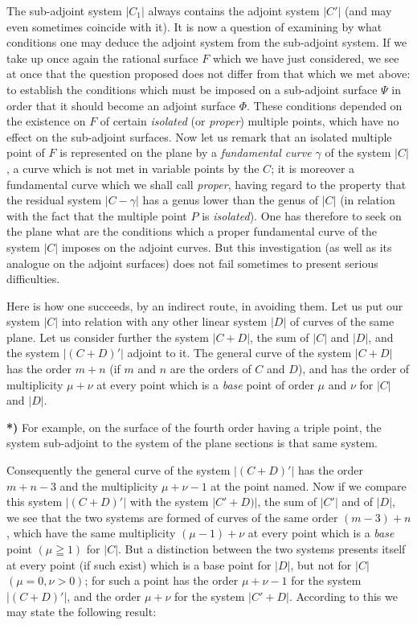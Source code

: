 \documentclass{article}
\begin{document}
The sub-adjoint system $|C_{1}|$ always contains the adjoint system $|C'|$ (and may even sometimes coincide with it). It is now a question of examining by what conditions one may deduce the adjoint system from the sub-adjoint system. If we take up once again the rational surface $F$ which we have just considered, we see at once that the question proposed does not differ from that which we met above: to establish the conditions which must be imposed on a sub-adjoint surface $\Psi$ in order that it should become an adjoint surface $\Phi$. These conditions depended on the existence on $F$ of certain \emph{isolated} (or \emph{proper}) multiple points, which have no effect on the sub-adjoint surfaces. Now let us remark that an isolated multiple point of $F$ is represented on the plane by a \emph{fundamental curve $\gamma$} of the system $|C|$, a curve which is not met in variable points by the $C$; it is moreover a fundamental curve which we shall call \emph{proper}, having regard to the property that the residual system $|C-\gamma|$ has a genus lower than the genus of $|C|$ (in relation with the fact that the multiple point $P$ is \emph{isolated}). One has therefore to seek on the plane what are the conditions which a proper fundamental curve of the system $|C|$ imposes on the adjoint curves. But this investigation (as well as its analogue on the adjoint surfaces) does not fail sometimes to present serious difficulties.

Here is how one succeeds, by an indirect route, in avoiding them. Let us put our system $|C|$ into relation with any other linear system $|D|$ of curves of the same plane. Let us consider further the system $|C+D|$, the sum of $|C|$ and $|D|$, and the system $|(C+D)'|$ adjoint to it. The general curve of the system $|C+D|$ has the order $m+n$ (if $m$ and $n$ are the orders of $C$ and $D$), and has the order of multiplicity $\mu+\nu$ at every point which is a \emph{base} point of order $\mu$ and $\nu$ for $|C|$ and $|D|$.

\textbf{*)} For example, on the surface of the fourth order having a triple point, the system sub-adjoint to the system of the plane sections is that same system.

Consequently the general curve of the system $|(C+D)'|$ has the order $m+n-3$ and the multiplicity $\mu + \nu - 1$ at the point named. Now if we compare this system $|(C + D)'|$ with the system $|C' + D)|$, the sum of $|C'|$ and of $|D|$, we see that the two systems are formed of curves of the same order $(m - 3) + n$, which have the same multiplicity $(\mu - 1) + \nu$ at every point which is a \emph{base} point $(\mu \geqq 1)$ for $|C|$. But a distinction between the two systems presents itself at every point (if such exist) which is a base point for $|D|$, but not for $|C|$ $(\mu = 0, \nu > 0)$; for such a point has the order $\mu + \nu - 1$ for the system $|(C + D)'|$, and the order $\mu + \nu$ for the system $|C' + D|$. According to this we may state the following result:
\end{document}
